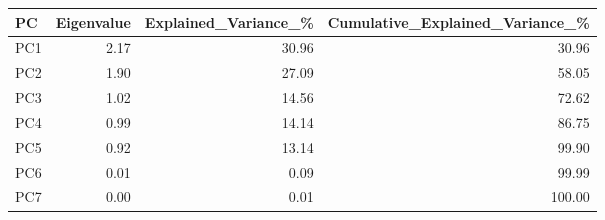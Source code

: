 \begin{tabular}{lrrr}
\toprule
PC & Eigenvalue & Explained\_Variance\_\% & Cumulative\_Explained\_Variance\_\% \\
\midrule
PC1 & 2.17 & 30.96 & 30.96 \\
PC2 & 1.90 & 27.09 & 58.05 \\
PC3 & 1.02 & 14.56 & 72.62 \\
PC4 & 0.99 & 14.14 & 86.75 \\
PC5 & 0.92 & 13.14 & 99.90 \\
PC6 & 0.01 & 0.09 & 99.99 \\
PC7 & 0.00 & 0.01 & 100.00 \\
\bottomrule
\end{tabular}
